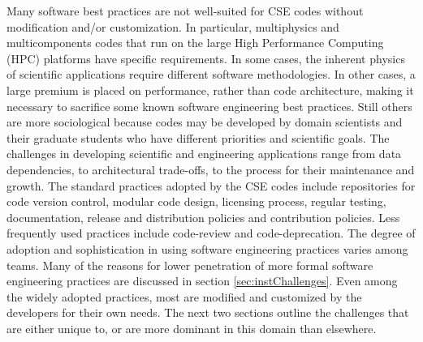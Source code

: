 Many software best practices are not well-suited for CSE codes without
modification and/or customization.  In particular, multiphysics and
multicomponents codes that run on the large High Performance Computing
(HPC) platforms have specific requirements.  In some cases, the
inherent physics of scientific applications require different software
methodologies.  In other cases, a large premium is placed on
performance, rather than code architecture, making it necessary to
sacrifice some known software engineering best practices.  Still
others are more sociological because codes may be developed by domain
scientists and their graduate students who have different priorities
and scientific goals.  
The challenges in developing scientific and engineering applications range
from data dependencies, to architectural trade-offs, to the process for their maintenance and
growth. 
The standard practices adopted by the CSE codes include
repositories for code version control, modular code design, licensing
process, regular testing, documentation, release and distribution
policies and contribution policies. Less frequently used practices
include code-review and code-deprecation. 
The degree of adoption and
sophistication in using software engineering practices varies among teams. Many of
the reasons for lower penetration of more formal software engineering practices are discussed in section
\ref{sec:instChallenges}. Even among the widely adopted
practices, most are modified and customized by the developers for
their own needs. The next two sections outline the challenges that
are either unique to, or are more dominant in this domain than
elsewhere.  


